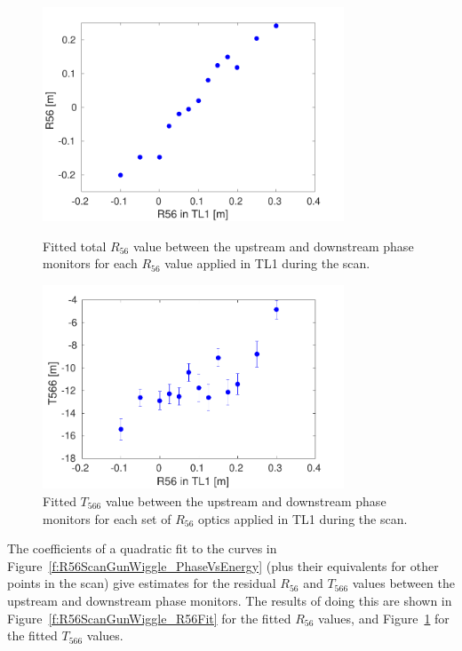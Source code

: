 \begin{figure}
  \centering
  \includegraphics[width=0.8\textwidth]{Figures/propagation/R56ScanGunWiggle_R56Fit}
  \caption{Fitted total \(R_{56}\) value between the upstream and downstream phase monitors for each \(R_{56}\) value applied in TL1 during the scan.}
  \label{f:R56ScanGunWiggle_R56Fit}
  \includegraphics[width=0.8\textwidth]{Figures/propagation/R56ScanGunWiggle_T566Fit}
  \caption{Fitted \(T_{566}\) value between the upstream and downstream phase monitors for each set of \(R_{56}\) optics applied in TL1 during the scan.}
  \label{f:R56ScanGunWiggle_T566Fit}
\end{figure}

The coefficients of a quadratic fit to the curves in Figure~\ref{f:R56ScanGunWiggle_PhaseVsEnergy} (plus their equivalents for other points in the scan) give estimates for the residual \(R_{56}\) and \(T_{566}\) values between the upstream and downstream phase monitors. The results of doing this are shown in Figure~\ref{f:R56ScanGunWiggle_R56Fit} for the fitted \(R_{56}\) values, and Figure~\ref{f:R56ScanGunWiggle_T566Fit} for the fitted \(T_{566}\) values. 

